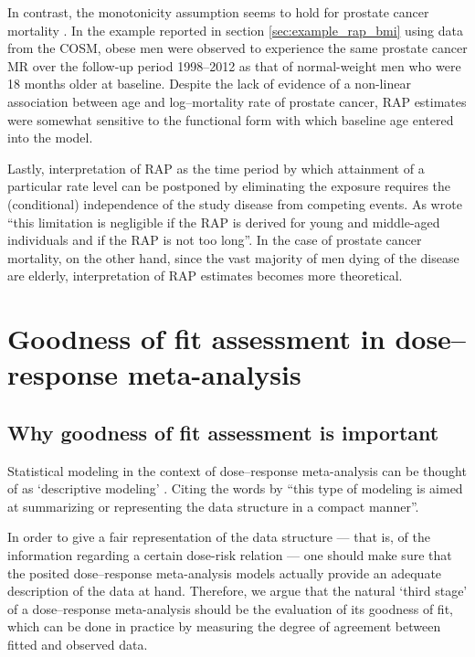 In contrast, the monotonicity assumption seems to hold for prostate cancer mortality \citep{ferlay_cancer_2015}. In the example reported in section \ref{sec:example_rap_bmi} using data from the COSM, obese men were observed to experience the same prostate cancer MR over the follow-up period 1998--2012 as that of normal-weight men who were 18 months older at baseline. Despite the lack of evidence of a non-linear association between age and log--mortality rate of prostate cancer, RAP estimates were somewhat sensitive to the functional form with which baseline age entered into the model. 

Lastly, interpretation of RAP as the time period by which attainment of a particular rate level can be postponed by eliminating the exposure requires the (conditional) independence of the study disease from competing events. As \citet{brenner_risk_1993} wrote ``this limitation is negligible if the RAP is derived for young and middle-aged individuals and if the RAP is not too long''. In the case of prostate cancer mortality, on the other hand, since the vast majority of men dying of the disease are elderly, interpretation of RAP estimates becomes more theoretical.




\section{Goodness of fit assessment in dose--response meta-analysis}

\subsection{Why goodness of fit assessment is important}

Statistical modeling in the context of dose--response meta-analysis can be thought of as `descriptive modeling' \citep{rosenthal_statistical_1985, shmueli_explain_2010}. Citing the words by \citet{shmueli_explain_2010} ``this type of modeling is aimed at summarizing or representing the data structure in a compact manner''. %

In order to give a fair representation of the data structure --- that is, of the information regarding a certain dose-risk relation --- one should make sure that the posited dose--response meta-analysis models actually provide an adequate description of the data at hand. Therefore, we argue that the natural `third stage' of a dose--response meta-analysis should be the evaluation of its goodness of fit, which can be done in practice by measuring the degree of agreement between fitted and observed data. 

